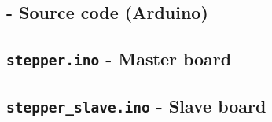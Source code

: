 \documentclass[11pt]{article}
\begin{document}
\nocite{lecture_slides}



\begin{appendices}
\appendix
\section{- Source code (Arduino)}
\subsection{\texttt{stepper.ino} - Master board}
\label{appendix:master}


\pagebreak
\subsection{\texttt{stepper\_slave.ino} - Slave board}
\label{appendix:slave}


\end{appendices}

\pagebreak


\end{document}
